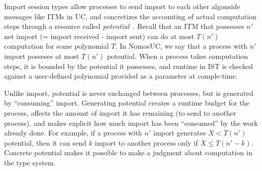 Import session types allow processes to send import to each other algonside messages like ITMs in UC, and concretizes the accounting of actual computation steps through a resource called \emph{potential}~\cite{das2018work,dasnomos}.
Recall that an ITM that possesses $n'$ net import (= import received - import sent) can do at most $T(n')$ computation for some polynomial $T$.
In NomosUC, we say that a process with $n'$ import posseses at most $T(n')$ potential.
When a process takes computation steps, it is bounded by the potential it possesses, and runtime in IST is checked against a user-defined polynomial provided as a parameter at comple-time.

Unlike import, potential is never exchanged between processes, but is generated by ``consuming'' import.
Generating potential creates a runtime budget for the process, affects the amount of import it has remaining (to send to another process), and makes explicit how much import has been ``consumed'' by the work already done.
For example, if a process with $n'$ import generates $X < T(n')$ potential, then it can send $k$ import to another process only if $X \leq T(n'-k)$.
Concrete potential makes it possible to make a judgment about computation in the type system.

